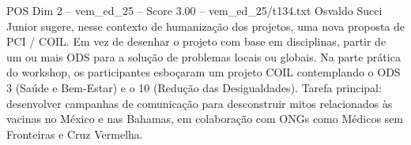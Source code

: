 \begin{textsample}{POS Dim 2 – vem\_ed\_25 – Score 3.00 – vem\_ed\_25/t134.txt}
Osvaldo Succi Junior sugere, nesse contexto de humanização dos projetos, uma nova proposta de PCI / COIL.
Em vez de desenhar o projeto com base em disciplinas, partir de um ou mais ODS para a solução de problemas locais ou globais.
Na parte prática do workshop, os participantes esboçaram um projeto COIL contemplando o ODS 3 (Saúde e Bem-Estar) e o 10 (Redução das Desigualdades).
Tarefa principal: desenvolver campanhas de comunicação para desconstruir mitos relacionados às vacinas no México e nas Bahamas, em colaboração com ONGs como Médicos sem Fronteiras e Cruz Vermelha.

\end{textsample}
